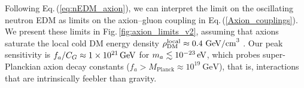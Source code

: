 Following Eq.\,(\ref{eq:nEDM_axion}), we can interpret the limit on the oscillating neutron EDM as limits on the axion--gluon coupling in Eq.\,(\ref{Axion_couplings}).
We present these limits in Fig.\,\ref{fig:axion_limits_v2}, assuming that axions saturate the local cold DM energy density $\rho_{\rm DM}^{\rm local} \approx 0.4~\textrm{GeV/cm}^3$ \cite{Catena2010}.
Our peak sensitivity is
$f_a/C_G \approx \unit[1 \times 10^{21}]{GeV}$ for $m_a \lesssim \unit[10^{-23}]{eV}$, which probes super-Planckian axion decay constants ($f_a > M_{\textrm{Planck}} \approx 10^{19}~\textrm{GeV}$), that is, interactions that are intrinsically feebler than gravity.

